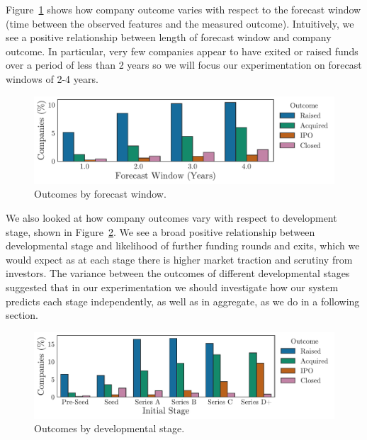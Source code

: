 \documentclass[../thesis/thesis.tex]{subfiles}
\begin{document}
Figure~\ref{fig:evaluation:outcome_forecast_window} shows how company outcome varies with respect to the forecast window (time between the observed features and the measured outcome). Intuitively, we see a positive relationship between length of forecast window and company outcome. In particular, very few companies appear to have exited or raised funds over a period of less than 2 years so we will focus our experimentation on forecast windows of 2-4 years.

\begin{figure}[!htb]
    \centering
    \includegraphics[width=\textwidth]{../figures/evaluation/outcomes_window}
    \caption[Outcomes by forecast window]{Outcomes by forecast window.}
    \label{fig:evaluation:outcome_forecast_window}
\end{figure}

We also looked at how company outcomes vary with respect to development stage, shown in Figure~\ref{fig:evaluation:outcome_stage}. We see a broad positive relationship between developmental stage and likelihood of further funding rounds and exits, which we would expect as at each stage there is higher market traction and scrutiny from investors. The variance between the outcomes of different developmental stages suggested that in our experimentation we should investigate how our system predicts each stage independently, as well as in aggregate, as we do in a following section.

\begin{figure}[!htb]
    \centering
    \includegraphics[width=\textwidth]{../figures/evaluation/outcomes_stage}
    \caption[Outcomes by developmental stage]{Outcomes by developmental stage.}
    \label{fig:evaluation:outcome_stage}
\end{figure}
\end{document}
